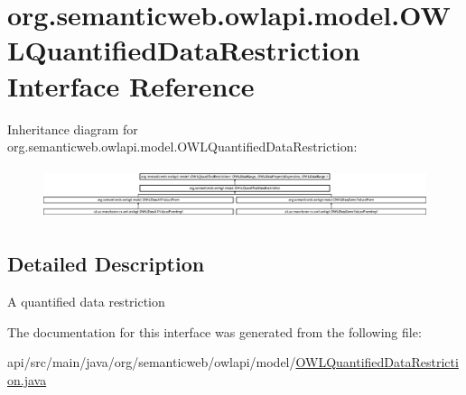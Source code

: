 \hypertarget{interfaceorg_1_1semanticweb_1_1owlapi_1_1model_1_1_o_w_l_quantified_data_restriction}{\section{org.\-semanticweb.\-owlapi.\-model.\-O\-W\-L\-Quantified\-Data\-Restriction Interface Reference}
\label{interfaceorg_1_1semanticweb_1_1owlapi_1_1model_1_1_o_w_l_quantified_data_restriction}
}
Inheritance diagram for org.\-semanticweb.\-owlapi.\-model.\-O\-W\-L\-Quantified\-Data\-Restriction\-:\begin{figure}[H]
\begin{center}
\leavevmode
\includegraphics[height=1.521739cm]{interfaceorg_1_1semanticweb_1_1owlapi_1_1model_1_1_o_w_l_quantified_data_restriction}
\end{center}
\end{figure}


\subsection{Detailed Description}
A quantified data restriction 

The documentation for this interface was generated from the following file\-:\begin{DoxyCompactItemize}
\item 
api/src/main/java/org/semanticweb/owlapi/model/\hyperlink{_o_w_l_quantified_data_restriction_8java}{O\-W\-L\-Quantified\-Data\-Restriction.\-java}\end{DoxyCompactItemize}
